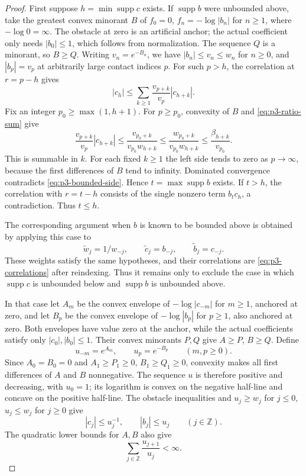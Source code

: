 \begin{proof}
First suppose $h=\min\operatorname{supp}c$ exists. If
$\operatorname{supp}b$ were unbounded above, take the greatest convex
minorant $B$ of $f_0=0$, $f_n=-\log|b_n|$ for $n\geq1$, where
$-\log0=\infty$. The obstacle at zero is an artificial anchor; the actual coefficient only
needs $|b_0|\leq1$, which follows from normalization.
The sequence $Q$ is a minorant, so $B\geq Q$.
Writing $v_n=e^{-B_n}$, we have $|b_n|\leq v_n\leq w_n$ for
$n\geq0$, and $|b_p|=v_p$ at arbitrarily large contact indices $p$.
For such $p>h$, the correlation at $r=p-h$ gives
\begin{equation}\label{eq:p3-bounded-side}
 |c_h|\leq\sum_{k\geq1}\frac{v_{p+k}}{v_p}|c_{h+k}|.
\end{equation}
Fix an integer $p_0\geq\max(1,h+1)$. For $p\geq p_0$, convexity
of $B$ and \eqref{eq:p3-ratio-sum} give
\[
 \frac{v_{p+k}}{v_p}|c_{h+k}|
 \leq\frac{v_{p_0+k}}{v_{p_0}w_{h+k}}
 \leq\frac{w_{p_0+k}}{v_{p_0}w_{h+k}}
 \leq\frac{\beta_{h+k}}{v_{p_0}}.
\]
This is summable in $k$. For each fixed $k\geq1$ the left side tends
to zero as $p\to\infty$, because the first differences of $B$ tend
to infinity. Dominated convergence contradicts
\eqref{eq:p3-bounded-side}. Hence $t=\max\operatorname{supp}b$
exists. If $t>h$, the correlation with $r=t-h$ consists of the single
nonzero term $b_tc_h$, a contradiction. Thus $t\leq h$.

The corresponding argument when $b$ is known to be bounded above is
obtained by applying this case to
\[
 \widetilde w_j=1/w_{-j},\qquad
 \widetilde c_j=b_{-j},\qquad
 \widetilde b_j=c_{-j}.
\]
These weights satisfy the same hypotheses, and their correlations are
\eqref{eq:p3-correlations} after reindexing. Thus it remains only to
exclude the case in which $\operatorname{supp}c$ is unbounded below
and $\operatorname{supp}b$ is unbounded above.

In that case let $A_m$ be the convex envelope of
$-\log|c_{-m}|$ for $m\geq1$, anchored at zero, and let $B_p$ be the
convex envelope of $-\log|b_p|$ for $p\geq1$, also anchored at zero.
Both envelopes have value zero at the anchor, while the actual
coefficients satisfy only $|c_0|,|b_0|\leq1$.
Their convex minorants $P,Q$ give $A\geq P$, $B\geq Q$.
Define
\[
 u_{-m}=e^{A_m},\qquad u_p=e^{-B_p}\qquad(m,p\geq0).
\]
Since $A_0=B_0=0$ and $A_1\geq P_1\geq0$, $B_1\geq Q_1\geq0$,
convexity makes all first differences of $A$ and $B$ nonnegative.
The sequence $u$ is therefore positive and decreasing, with $u_0=1$; its
logarithm is convex on the negative half-line and concave on the
positive half-line. The obstacle inequalities and
$u_j\geq w_j$ for $j\leq0$, $u_j\leq w_j$ for $j\geq0$ give
\begin{equation}\label{eq:p3-envelope-bounds}
 |c_j|\leq u_j^{-1},\qquad |b_j|\leq u_j
 \qquad(j\in\mathbb Z).
\end{equation}
The quadratic lower bounds for $A,B$ also give
\begin{equation}\label{eq:p3-envelope-ratios}
 \sum_{j\in\mathbb Z}\frac{u_{j+1}}{u_j}<\infty.
\end{equation}


\end{proof}
